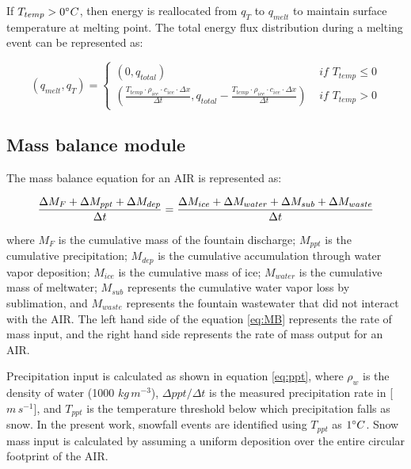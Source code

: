 If $T_{temp} > 0 ^{\circ} C$, then energy is reallocated from $q_{T}$ to $q_{melt}$ to maintain surface
temperature at melting point. The total energy flux distribution during a melting event can be represented as:

\begin{equation}
	(q_{melt}, q_{T}) = \left\{ \begin{array}{ll}
		(0, q_{total})
		                                                                                                                                                               & \textit{ if } T_{temp} \leq 0 \\
		(\frac{T_{temp} \cdot \rho_{ice} \cdot c_{ice} \cdot \Delta x}{\Delta t}, q_{total}-\frac{T_{temp} \cdot \rho_{ice} \cdot c_{ice} \cdot \Delta x}{\Delta t}  ) & \textit{ if } T_{temp} > 0
	\end{array} \right.
\end{equation}

\subsection{Mass balance module}

The mass balance equation for an \ac{AIR} is represented as:

\begin{equation}
	\frac{\Delta M_{F} + \Delta M_{ppt} + \Delta M_{dep}}{\Delta t} = \frac{\Delta M_{ice} +\Delta M_{water} +
		\Delta M_{sub} + \Delta M_{waste}}{\Delta t}  \\
	\label{eq:MB}
\end{equation}

where $M_{F}$ is the cumulative mass of the fountain discharge; $M_{ppt}$ is the cumulative precipitation;  $M_{dep}$ is the cumulative
accumulation through water vapor deposition; $M_{ice}$ is the cumulative mass of ice; $M_{water}$ is the cumulative
mass of meltwater; $M_{sub}$ represents the cumulative water vapor loss by sublimation, and $M_{waste}$ represents the
fountain wastewater that did not interact with the \ac{AIR}. The left hand side of the equation \ref{eq:MB} represents the rate of
mass input, and the right hand side represents the rate of mass output for an \ac{AIR}.

Precipitation input is calculated as shown in equation \ref{eq:ppt}, where $\rho_{w}$ is the density of water (1000
$kg\,m^{-3}$), $\Delta ppt/ \Delta t$ is the measured precipitation rate in [$m\,s^{-1}$], and $T_{ppt}$ is the temperature threshold
below which precipitation falls as snow. In the present work, snowfall events are identified using $T_{ppt}$ as $1 ^{\circ} C$. Snow
mass input is calculated by assuming a uniform deposition over the entire circular footprint of the \ac{AIR}.

